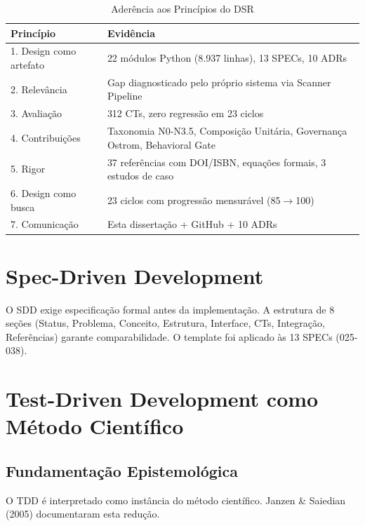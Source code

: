 \begin{table}[H]
\centering
\small
\caption{Aderência aos Princípios do DSR}
\label{tab:dsr}
\begin{tabular}{p{3.5cm}p{9.5cm}}
\toprule
\textbf{Princípio} & \textbf{Evidência} \\
\midrule
1. Design como artefato & 22 módulos Python (8.937 linhas), 13 SPECs, 10 ADRs \\
2. Relevância & Gap diagnosticado pelo próprio sistema via Scanner Pipeline \\
3. Avaliação & 312 CTs, zero regressão em 23 ciclos \\
4. Contribuições & Taxonomia N0-N3.5, Composição Unitária, Governança Ostrom, Behavioral Gate \\
5. Rigor & 37 referências com DOI/ISBN, equações formais, 3 estudos de caso \\
6. Design como busca & 23 ciclos com progressão mensurável (85$\rightarrow$100) \\
7. Comunicação & Esta dissertação + GitHub + 10 ADRs \\
\bottomrule
\end{tabular}
\end{table}

\section{Spec-Driven Development}

O SDD exige especificação formal antes da implementação. A estrutura de 8 seções (Status, Problema, Conceito, Estrutura, Interface, CTs, Integração, Referências) garante comparabilidade. O template foi aplicado às 13 SPECs (025-038).

\section{Test-Driven Development como Método Científico}

\subsection{Fundamentação Epistemológica}

O TDD é interpretado como instância do método científico. Janzen \& Saiedian (2005) documentaram esta redução.


